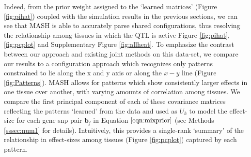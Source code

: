 Indeed, from the prior weight assigned to the `learned matrices' (Figure \ref{fig:pihat}) coupled with the simulation results in the previous sections, we can see that MASH is able to accurately parse shared configurations, thus resolving the relationship among tissues in which the QTL is active Figure \ref{fig:pihat}, \ref{fig:pcplot} and Supplementary Figure \ref{fig:allheat}. 
To emphasize the contrast  between our approach and existing joint methods on this data-set, we compare our results to a configuration approach which recognizes only patterns constrained to lie along the x and y axis or along the $x-y$ line (Figure \ref{fig:Patterns}). MASH allows for patterns which show consistently larger effects in one tissue over another, with varying amounts of correlation among tissues.   We compare the first principal component of each of these covariance matrices reflecting the patterns `learned' from the data and used as $U_{k}$ to model the effect-size for each gene-snp pair $\bm{b}_{j}$ in Equation $\ref{eqn:mixprior}$ (see Methods \ref{sssec:num1} for details). Intuitively, this provides a single-rank `summary' of the relationship in effect-sizes among tissues (Figure \ref{fig:pcplot}) captured by each pattern. 


